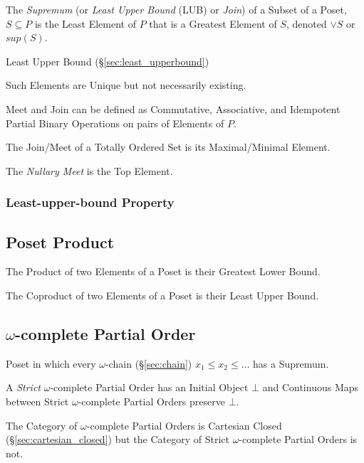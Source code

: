 The \emph{Supremum} (or \emph{Least Upper Bound} (LUB) or \emph{Join})
of a Subset of a Poset, $S \subseteq P$ is the Least Element of $P$
that is a Greatest Element of $S$, denoted $\vee S$ or $sup (S)$.

Least Upper Bound (\S\ref{sec:least_upperbound})

Such Elements are Unique but not necessarily existing.

Meet and Join can be defined as Commutative, Associative, and
Idempotent Partial Binary Operations on pairs of Elements of $P$.

The Join/Meet of a Totally Ordered Set is its Maximal/Minimal Element.

The \emph{Nullary Meet} is the Top Element.



\subsubsection{Least-upper-bound Property}\label{sec:leastupperbound_property}



\subsection{Poset Product}\label{sec:poset_product}

The Product of two Elements of a Poset is their Greatest Lower Bound.

The Coproduct of two Elements of a Poset is their Least Upper Bound.



\subsection{$\omega$-complete Partial Order}\label{sec:omega_cpo}

Poset in which every $\omega$-chain (\S\ref{sec:chain}) $x_1 \leq x_2
\leq \ldots$ has a Supremum.

A \emph{Strict} $\omega$-complete Partial Order has an Initial Object
$\bot$ and Continuous Maps between Strict $\omega$-complete Partial
Orders preserve $\bot$.

The Category of $\omega$-complete Partial Orders is Cartesian Closed
(\S\ref{sec:cartesian_closed}) but the Category of Strict
$\omega$-complete Partial Orders is not.

